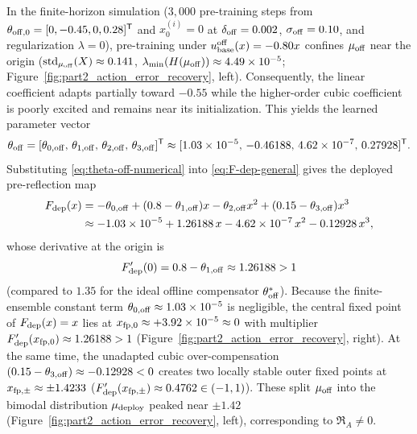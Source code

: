 In the finite-horizon simulation ($3{,}000$ pre-training steps from $\theta_{\rm off,0}=[0,-0.45,0,0.28]^{\mathsf T}$ and $x_0^{(i)}=0$ at $\delta_{\rm off}=0.002$, $\sigma_{\rm off}=0.10$, and regularization $\lambda=0$), pre-training under $u_{\rm base}^{\rm off}(x) = -0.80x$ confines $\mu_{\rm off}$ near the origin ($\operatorname{std}_{\mu_{\rm off}}(X)\approx 0.141$, $\lambda_{\min}(H(\mu_{\rm off}))\approx 4.49\times 10^{-5}$; Figure~\ref{fig:part2_action_error_recovery}, left). Consequently, the linear coefficient adapts partially toward $-0.55$ while the higher-order cubic coefficient is poorly excited and remains near its initialization. This yields the learned parameter vector
\begin{equation}
    \theta_{\rm off} = [\theta_{0,\rm off},\, \theta_{1,\rm off},\, \theta_{2,\rm off},\, \theta_{3,\rm off}]^{\mathsf T} \approx [1.03\times 10^{-5},\, -0.46188,\, 4.62\times 10^{-7},\, 0.27928]^{\mathsf T}.
    \label{eq:theta-off-numerical}
\end{equation}
Substituting \eqref{eq:theta-off-numerical} into \eqref{eq:F-dep-general} gives the deployed pre-reflection map
\[
\begin{aligned}
    F_{\rm dep}(x) &= -\theta_{0,\rm off} + (0.8 - \theta_{1,\rm off})x - \theta_{2,\rm off}x^2 + (0.15 - \theta_{3,\rm off})x^3 \\
    &\approx -1.03\times 10^{-5} + 1.26188\,x - 4.62\times 10^{-7}\,x^2 - 0.12928\,x^3,
\end{aligned}
\]
whose derivative at the origin is
\begin{equation}
    F_{\rm dep}'(0) = 0.8 - \theta_{1,\rm off} \approx 1.26188 > 1
    \label{eq:F-dep-slope}
\end{equation}
(compared to $1.35$ for the ideal offline compensator $\theta_{\rm off}^*$). Because the finite-ensemble constant term $\theta_{0,\rm off}\approx 1.03\times 10^{-5}$ is negligible, the central fixed point of $F_{\rm dep}(x)=x$ lies at $x_{\rm fp,0} \approx +3.92\times 10^{-5} \approx 0$ with multiplier $F_{\rm dep}'(x_{\rm fp,0}) \approx 1.26188 > 1$ (Figure~\ref{fig:part2_action_error_recovery}, right). At the same time, the unadapted cubic over-compensation $(0.15-\theta_{3,\rm off}) \approx -0.12928 < 0$ creates two locally stable outer fixed points at $x_{{\rm fp},\pm} \approx \pm 1.4233$ ($F_{\rm dep}'(x_{{\rm fp},\pm}) \approx 0.4762 \in (-1,1)$). These split $\mu_{\rm off}$ into the bimodal distribution $\mu_{\rm deploy}$ peaked near $\pm 1.42$ (Figure~\ref{fig:part2_action_error_recovery}, left), corresponding to $\mathfrak{R}_A \neq 0$.

